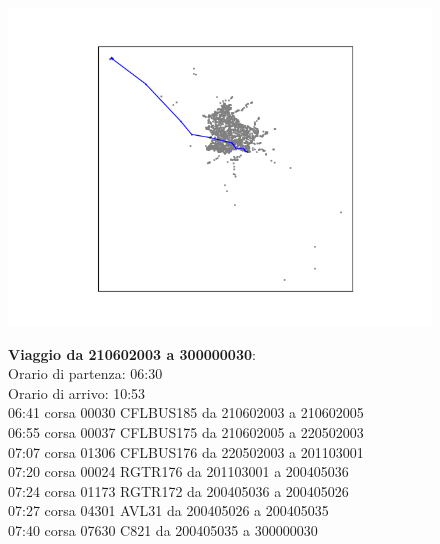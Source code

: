 \documentclass{article}
\begin{document}
\begin{figure}[H]
	\begin{minipage}{0.55\linewidth}
		\centering
		\hspace*{-3cm}\includegraphics[width=1.0\linewidth, valign=t]{figures/210602003_300000030}
	\end{minipage}
	\hspace*{-2cm}\begin{minipage}{0.7\linewidth}
		\textbf{Viaggio da 210602003 a 300000030}:\\
		Orario di partenza: 06:30\\
		Orario di arrivo: 10:53\\
		06:41 corsa 00030 CFLBUS185 da 210602003 a 210602005\\
		06:55 corsa 00037 CFLBUS175 da 210602005 a 220502003\\
		07:07 corsa 01306 CFLBUS176 da 220502003 a 201103001\\
		07:20 corsa 00024 RGTR176 da 201103001 a 200405036\\
		07:24 corsa 01173 RGTR172 da 200405036 a 200405026\\
		07:27 corsa 04301 AVL31 da 200405026 a 200405035\\
		07:40 corsa 07630 C821 da 200405035 a 300000030
			\end{minipage}
\end{figure}
\end{document}

